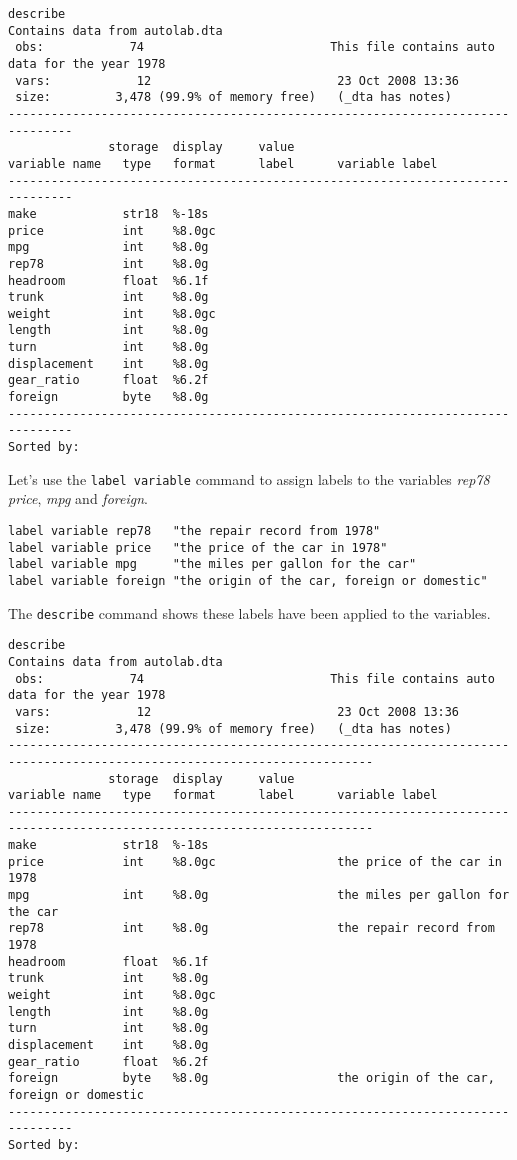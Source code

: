 \begin{lstlisting}
describe
Contains data from autolab.dta
 obs:            74                          This file contains auto data for the year 1978
 vars:            12                          23 Oct 2008 13:36
 size:         3,478 (99.9% of memory free)   (_dta has notes)
-------------------------------------------------------------------------------
              storage  display     value
variable name   type   format      label      variable label
-------------------------------------------------------------------------------
make            str18  %-18s
price           int    %8.0gc
mpg             int    %8.0g
rep78           int    %8.0g
headroom        float  %6.1f
trunk           int    %8.0g
weight          int    %8.0gc
length          int    %8.0g
turn            int    %8.0g
displacement    int    %8.0g
gear_ratio      float  %6.2f
foreign         byte   %8.0g
-------------------------------------------------------------------------------
Sorted by:
\end{lstlisting}

Let's use the \lstinline{label variable} command to assign labels to the variables \textit{rep78} \textit{price}, \textit{mpg} and \textit{foreign}.

\begin{lstlisting}
label variable rep78   "the repair record from 1978"
label variable price   "the price of the car in 1978"
label variable mpg     "the miles per gallon for the car"
label variable foreign "the origin of the car, foreign or domestic"
\end{lstlisting}

The \lstinline{describe} command shows these labels have been applied to the variables.

\begin{lstlisting}
describe
Contains data from autolab.dta
 obs:            74                          This file contains auto data for the year 1978
 vars:            12                          23 Oct 2008 13:36
 size:         3,478 (99.9% of memory free)   (_dta has notes)
-------------------------------------------------------------------------------------------------------------------------
              storage  display     value
variable name   type   format      label      variable label
-------------------------------------------------------------------------------------------------------------------------
make            str18  %-18s
price           int    %8.0gc                 the price of the car in 1978
mpg             int    %8.0g                  the miles per gallon for the car
rep78           int    %8.0g                  the repair record from 1978
headroom        float  %6.1f
trunk           int    %8.0g
weight          int    %8.0gc
length          int    %8.0g
turn            int    %8.0g
displacement    int    %8.0g
gear_ratio      float  %6.2f
foreign         byte   %8.0g                  the origin of the car, foreign or domestic
-------------------------------------------------------------------------------
Sorted by:
\end{lstlisting}

